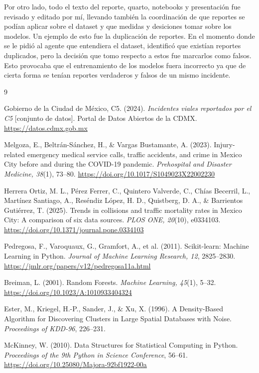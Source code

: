 \documentclass[11pt,letterpaper]{article}
\begin{document}
Por otro lado, todo el texto del reporte, quarto, notebooks y presentación
fue revisado y editado por mí, llevando también la coordinación de que reportes se podían
aplicar sobre el dataset y que medidas y desiciones tomar sobre los modelos. Un ejemplo 
de esto fue la duplicación de reportes. En el momento donde se le pidió al agente que 
entendiera el dataset, identificó que existían reportes duplicados, pero la decisión que
tomo respecto a estos fue marcarlos como falsos. Esto provocaba que el entrenamiento de
los modelos fuera incorrecto ya que de cierta forma se tenían reportes verdaderos y 
falsos de un mismo incidente. 

\begin{thebibliography}{9}

 Gobierno de la Ciudad de México, C5. (2024).
  \emph{Incidentes viales reportados por el C5} [conjunto de datos]. Portal de
  Datos Abiertos de la CDMX. \url{https://datos.cdmx.gob.mx}

 Melgoza, E., Beltrán-Sánchez, H., \& Vargas Bustamante, A.
  (2023). Injury-related emergency medical service calls, traffic accidents,
  and crime in Mexico City before and during the COVID-19 pandemic.
  \emph{Prehospital and Disaster Medicine, 38}(1), 73--80.
  \url{https://doi.org/10.1017/S1049023X22002230}

 Herrera Ortiz, M. L., Pérez Ferrer, C., Quintero
  Valverde, C., Chías Becerril, L., Martínez Santiago, A., Reséndiz López,
  H. D., Quistberg, D. A., \& Barrientos Gutiérrez, T. (2025). Trends in
  collisions and traffic mortality rates in Mexico City: A comparison of six
  data sources. \emph{PLOS ONE, 20}(10), e0334103.
  \url{https://doi.org/10.1371/journal.pone.0334103}

 Pedregosa, F., Varoquaux, G., Gramfort, A., et al. (2011).
  Scikit-learn: Machine Learning in Python. \emph{Journal of Machine Learning
  Research, 12}, 2825--2830.
  \url{https://jmlr.org/papers/v12/pedregosa11a.html}

 Breiman, L. (2001). Random Forests. \emph{Machine Learning,
  45}(1), 5--32. \url{https://doi.org/10.1023/A:1010933404324}

 Ester, M., Kriegel, H.-P., Sander, J., \& Xu, X. (1996). A
  Density-Based Algorithm for Discovering Clusters in Large Spatial Databases
  with Noise. \emph{Proceedings of KDD-96}, 226--231.

 McKinney, W. (2010). Data Structures for Statistical
  Computing in Python. \emph{Proceedings of the 9th Python in Science
  Conference}, 56--61. \url{https://doi.org/10.25080/Majora-92bf1922-00a}

\end{thebibliography}
\end{document}
